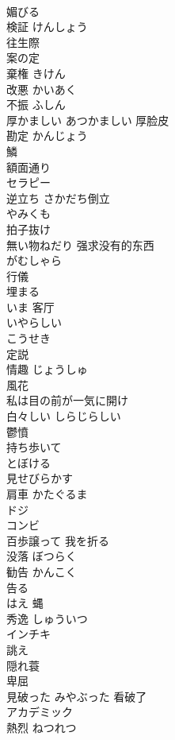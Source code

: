 \documentclass[8pt]{extreport}
\begin{document}
\begin{CJK}{UTF8}{min}
\\	媚びる	
\\	検証	けんしょう
\\	往生際	
\\	案の定	
\\	棄権	きけん
\\	改悪	かいあく
\\	不振	ふしん
\\	厚かましい	あつかましい 厚脸皮
\\	勘定	かんじょう
\\	鱗	
\\	額面通り	
\\	セラピー	
\\	逆立ち	さかだち倒立
\\	やみくも	
\\	拍子抜け	
\\	無い物ねだり	强求没有的东西
\\	がむしゃら	
\\	行儀	
\\	埋まる	
\\	いま	客厅
\\	いやらしい	
\\	こうせき	
\\	定説	
\\	情趣	じょうしゅ
\\	風花	
\\	私は目の前が一気に開け	
\\	白々しい	しらじらしい
\\	鬱憤	
\\	持ち歩いて	
\\	とぼける	
\\	見せびらかす	
\\	肩車	かたぐるま
\\	ドジ	
\\	コンビ	
\\	百歩譲って 我を折る	
\\	没落	ぼつらく
\\	勧告	かんこく
\\	告る	
\\	はえ	蝿
\\	秀逸	しゅういつ
\\	インチキ	
\\	誂え	
\\	隠れ蓑	
\\	卑屈	
\\	見破った	みやぶった 看破了
\\	アカデミック	
\\	熱烈	ねつれつ

\end{CJK}
\end{document}
